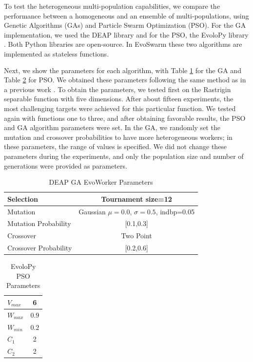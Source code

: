 \documentclass[review]{elsarticle}
\begin{document}
To test the heterogeneous multi-population capabilities,  we compare the
performance between a homogeneous and an ensemble of multi-populations, using
Genetic Algorithms (GAs) and Particle Swarm Optimization (PSO). For the GA
implementation, we used the DEAP library \cite{fortin2012deap} and for the PSO,
the EvoloPy library \cite{faris2016evolopy}. Both Python libraries are
open-source. In EvoSwarm these two algorithms are implemented as stateless
functions.

Next, we show the parameters for each algorithm, with Table \ref{tab:GAparams} for
the GA and Table \ref{tab:PSOparams} for PSO. We obtained these parameters
following the same method as in a previous work \cite{garcia2017benchmarking}.
To obtain the parameters, we tested first on the Rastrigin separable function
with five dimensions. After about fifteen experiments, the most challenging
targets were achieved for this particular function. We tested again with
functions one to three, and after obtaining favorable results, the PSO and GA
algorithm parameters were set. In the GA, we randomly set the mutation and
crossover probabilities to have more heterogeneous workers; in these parameters,
the range of values is specified. We did not change these parameters during the
experiments, and only the population size and number of generations were
provided as parameters. 

\begin{table}
  \small
  \caption{ DEAP GA EvoWorker Parameters }
  \label{tab:GAparams} 
  \centering
  \small
  \begin{tabular}{|l|c|}
    \hline
    Selection & Tournament size=12                            \\ \hline
    Mutation & Gaussian $\mu=0.0$, $\sigma=0.5$, indbp=0.05   \\ \hline
    Mutation Probability & [0.1,0.3]                          \\ \hline
    Crossover & Two Point                                     \\ \hline
    Crossover Probability  & [0.2,0.6]                          \\ \hline
  \end{tabular}
\end{table}

\begin{table}
  \small
  \caption{ EvoloPy PSO Parameters }
  \label{tab:PSOparams} 
  \centering
  \small
  \begin{tabular}{|l|c|}
    \hline
    $V_{max}$ & 6 \\ \hline
    $W_{max}$ & $0.9$ \\ \hline
    $W_{min}$ & $0.2$ \\ \hline
    $C_1$ & 2 \\ \hline
    $C_2$ & 2 \\ \hline
  \end{tabular}
\end{table}
\end{document}
